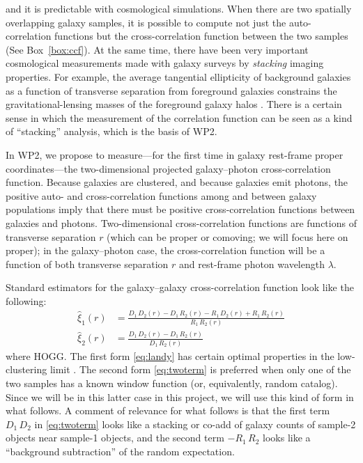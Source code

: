 \documentclass[12pt]{article}
\newcounter{box}
\newcommand{\boxname}{Box}
\newcommand{\boxref}[1]{\boxname~\ref{#1}}
\begin{document}
and it is predictable with cosmological simulations.
When there are two spatially overlapping galaxy samples, it is possible to compute not just the auto-correlation functions but the cross-correlation function between the two samples (See \boxref{box:ccf}).
At the same time, there have been very important cosmological measurements made with galaxy surveys by \emph{stacking} imaging properties.
For example, the average tangential ellipticity of background galaxies as a function of transverse separation from foreground galaxies constrains the gravitational-lensing masses of the foreground galaxy halos \cite{galgal}.
There is a certain sense in which the measurement of the correlation function can be seen as a kind of ``stacking'' analysis, which is the basis of WP2.

In WP2, we propose to measure---for the first time in galaxy rest-frame proper coordinates---the two-dimensional projected galaxy--photon cross-correlation function.
Because galaxies are clustered, and because galaxies emit photons, the positive auto- and cross-correlation functions among and between galaxy populations imply that there must be positive cross-correlation functions between galaxies and photons.
Two-dimensional cross-correlation functions are functions of transverse separation $r$ (which can be proper or comoving; we will focus here on proper);
in the galaxy--photon case, the cross-correlation function will be a function of both transverse separation $r$ and rest-frame photon wavelength $\lambda$.

Standard estimators for the galaxy--galaxy cross-correlation function look like the following:
\begin{align}
  \hat{\xi}_{1} (r) &= \frac{
    D_1 \, D_2 (r)
    - D_1 \, R_2 (r)
    - R_1 \, D_2 (r)
    + R_1 \, R_2 (r)
  }{
    R_1 \, R_2 (r)
  } \label{eq:landy} \\
  \hat{\xi}_{2} (r) &= \frac{
    D_1 \, D_2 (r)
    - D_1 \, R_2 (r)
  }{
    D_1 \, R_2 (r)
  } \label{eq:twoterm}
\end{align}
where HOGG.
The first form \eqref{eq:landy} has certain optimal properties in the low-clustering limit \cite{landy}.
The second form \eqref{eq:twoterm} is preferred when only one of the two samples has a known window function (or, equivalently, random catalog).
Since we will be in this latter case in this project, we will use this kind of form in what follows.
A comment of relevance for what follows is that the first term $D_1\,D_2$ in \eqref{eq:twoterm} looks like a stacking or co-add of galaxy counts of sample-2 objects near sample-1 objects, and the second term $-R_1\,R_2$ looks like a ``background subtraction'' of the random expectation.
\end{document}

